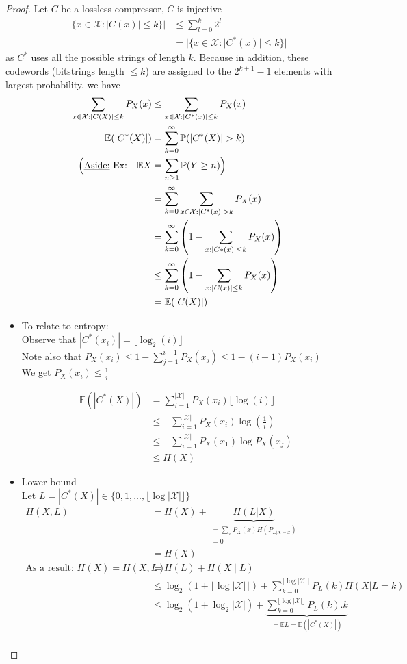 \begin{proof}
Let $C$ be a lossless compressor, $C$ is injective
\begin{align*}
|\{x\in \mathcal{X}:|C(x)|\leq k \}| & \leq \sum_{l=0}^{k} 2^l\\
& = |\{x\in \mathcal{X}: |C^*(x)|\leq k\}|
\end{align*}
as $C^*$ uses all the possible strings of length $k$.
Because in addition, these codewords (bitstrings length $\leq k$) are assigned to the $2^{k+1} - 1$ elements with largest probability, we have
\begin{align*}
\sum_{x\in \mathcal{X} : |C(X)|\leq k} P_X(x) & \leq \sum_{x\in \mathcal{X} : |C^* (x)|\leq k} P_X(x)\\
\mathbb{E}(|C^*(X)|) & = \sum_{k=0}^\infty \mathbb{P}(|C^*(X)|>k)\\
\Big( \text{\underline{Aside:} Ex:}\quad \mathbb{E}X &= \sum_{n\geq 1} \mathbb{P}(Y\geq n)\Big)\\
& = \sum_{k=0}^\infty \sum_{x\in \mathcal{X}:|C^*(x)|>k}P_X(x)\\
& = \sum_{k=0}^\infty \left( 1- \sum_{x : |C*(x)|\leq k} P_X(x) \right)\\
& \leq \sum_{k=0}^\infty \left( 1 - \sum_{x: |C(x)|\leq k} P_X(x) \right)\\
& = \mathbb{E} (|C(X)|)
\end{align*}
\begin{itemize}
\item To relate to entropy:\\
Observe that $|C^*(x_i)|=\lfloor \log_2 (i) \rfloor$\\
Note also that $P_X(x_i)\leq 1-\sum_{j=1}^{i-1} P_X(x_j)\leq 1-(i-1)P_X(x_i)$\\
We get $P_X(x_i)\leq \frac{1}{i}$

\begin{align*}
\mathbb{E}(|C^*(X)|) & = \sum_{i=1}^{|\mathcal{X}|} P_X(x_i) \lfloor \log (i) \rfloor\\
 & \leq - \sum_{i=1}^{|\mathcal{X}|}P_X(x_i) \log \left( \frac{1}{i} \right)\\
 & \leq - \sum_{i=1}^{|\mathcal{X}|} P_X(x_1) \log P_X(x_j)\\
 &\leq H(X)
\end{align*}

\item Lower bound\\
Let $L=|C^*(X)|\in \{0,1,...,\lfloor \log |\mathcal{X} | \rfloor\}$
\begin{align*}
H(X,L) & =H(X)+\underbrace{H(L|X)}_{\substack{= \sum_x P_X(x)H(P_{L|X=x}) \\ =0}}\\
& = H(X)\\
\text{As a result: } H(X)=H(X,L) & =H(L)+ H(X\; | \;L)\\
& \leq \log_2 (1+ \lfloor \log|\mathcal{X}|\rfloor) + \sum_{k=0}^{\lfloor \log |\mathcal{X}|\rfloor} P_L(k)H(X|L=k)\\
& \leq \log_2(1+\log_2 |\mathcal{X}|)+ \underbrace{\sum_{k=0}^{\lfloor \log |\mathcal{X}|\rfloor} P_L(k).k}_{=\mathbb{E}L=\mathbb{E}(|C^*(X)|)}\\
\end{align*}


\end{itemize}
\end{proof}
